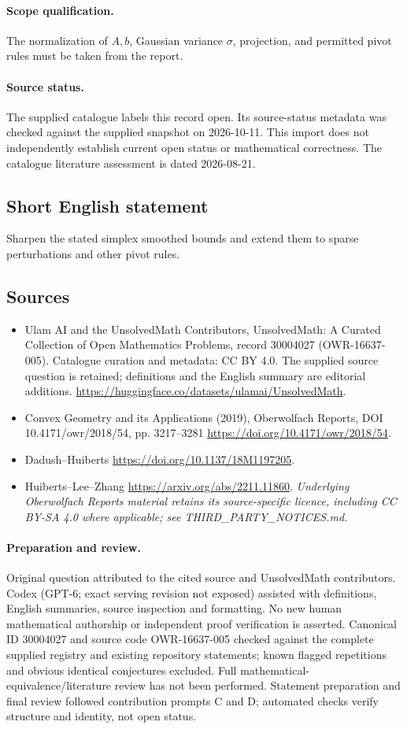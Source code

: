 \documentclass[11pt]{article}
\begin{document}
\paragraph{Scope qualification.}
The normalization of $A,b$, Gaussian variance $\sigma$, projection, and permitted pivot rules must be taken from the report.
\paragraph{Source status.}
The supplied catalogue labels this record open. Its source-status metadata was checked against the supplied snapshot on 2026-10-11. This import does not independently establish current open status or mathematical correctness. The catalogue literature assessment is dated 2026-08-21.
\subsection{Short English statement}
Sharpen the stated simplex smoothed bounds and extend them to sparse perturbations and other pivot rules.
\subsection{Sources}
\begin{itemize}
\item[S1] Ulam AI and the UnsolvedMath Contributors, UnsolvedMath: A Curated Collection of Open Mathematics Problems, record 30004027 (OWR-16637-005). Catalogue curation and metadata: CC BY 4.0. The supplied source question is retained; definitions and the English summary are editorial additions.
\url{https://huggingface.co/datasets/ulamai/UnsolvedMath}.
\item[S2] Convex Geometry and its Applications (2019), Oberwolfach Reports, DOI 10.4171/owr/2018/54, pp. 3217--3281
\url{https://doi.org/10.4171/owr/2018/54}.
\item[S3] Dadush--Huiberts
\url{https://doi.org/10.1137/18M1197205}.
\item[S4] Huiberts--Lee--Zhang
\url{https://arxiv.org/abs/2211.11860}.
\textit{Underlying Oberwolfach Reports material retains its source-specific licence, including CC BY-SA 4.0 where applicable; see THIRD\_PARTY\_NOTICES.md.}
\end{itemize}
\paragraph{Preparation and review.}
Original question attributed to the cited source and UnsolvedMath contributors. Codex (GPT-6; exact serving revision not exposed) assisted with definitions, English summaries, source inspection and formatting. No new human mathematical authorship or independent proof verification is asserted. Canonical ID 30004027 and source code OWR-16637-005 checked against the complete supplied registry and existing repository statements; known flagged repetitions and obvious identical conjectures excluded. Full mathematical-equivalence/literature review has not been performed. Statement preparation and final review followed contribution prompts C and D; automated checks verify structure and identity, not open status.
\label{end:30004027}
\end{document}

